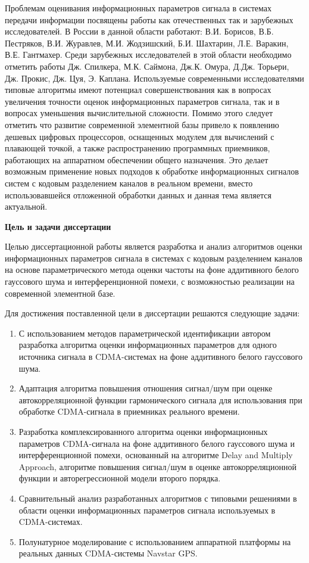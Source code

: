 Проблемам оценивания информационных параметров сигнала в системах передачи информации посвящены работы как отечественных так и зарубежных исследователей.
В России в данной области работают: В.И. Борисов, В.Б. Пестряков, В.И. Журавлев, М.И. Жодзишский,
Б.И. Шахтарин, Л.Е. Варакин, В.Е. Гантмахер.
Среди зарубежных исследователей в этой области необходимо отметить работы Дж. Спилкера, М.К. Саймона, Дж.К. Омура, Д.Дж. Торьери, Дж. Прокис, Дж. Цуя, Э. Каплана.
Используемые современными исследователями типовые алгоритмы имеют потенциал совершенствования как в вопросах увеличения точности оценок
информационных параметров сигнала, так и в вопросах уменьшения вычислительной сложности.
Помимо этого следует отметить что развитие современной элементной базы привело к появлению дешевых цифровых процессоров, оснащенных модулем для вычислений
с плавающей точкой, а также распространению программных приемников, работающих на аппаратном обеспечении общего назначения. Это делает возможным применение новых
подходов к обработке информационных сигналов систем с кодовым разделением каналов в реальном времени, вместо использовавшейся отложенной обработки данных и данная
тема является актуальной.

{\bf{Цель и задачи диссертации}}

Целью диссертационной работы является разработка и анализ алгоритмов оценки информационных параметров сигнала в системах с кодовым разделением каналов на основе
параметрического метода оценки частоты на фоне аддитивного белого гауссового шума и интерференционной помехи,
с возможностью реализации на современной элементной базе.

Для достижения поставленной цели в диссертации решаются следующие задачи:
\begin{enumerate}
	\item {С использованием методов параметрической идентификации автором разработка алгоритма оценки информационных параметров для одного источника сигнала
		в CDMA-системах на фоне аддитивного белого гауссового шума.}
	\item {Адаптация алгоритма повышения отношения сигнал/шум при оценке автокорреляционной функции гармонического сигнала для использования при обработке
		CDMA-сигнала в приемниках реального времени.}
	\item {Разработка комплексированного алгоритма оценки информационных параметров CDMA-сигнала на фоне аддитивного белого гауссового шума и
		интерференционной помехи, основанный на алгоритме Delay and Multiply Approach, алгоритме повышения сигнал/шум в оценке автокорреляционной функции 
		и авторегрессионной модели второго порядка.}
	\item {Сравнительный анализ разработанных алгоритмов с типовыми решениями в области оценки информационных параметров сигнала используемых в CDMA-системах.}
	\item {Полунатурное моделирование с использованием аппаратной платформы на реальных данных CDMA-системы Navstar GPS.}
\end{enumerate}

